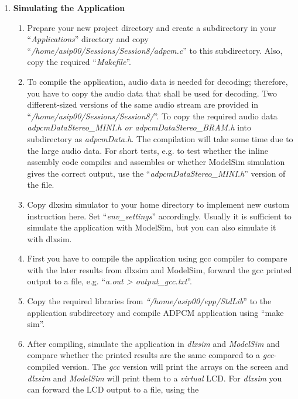 \documentclass[
]{article}
\begin{document}
\begin{enumerate}
\def\labelenumi{\arabic{enumi}.}
\setcounter{enumi}{2}
\item
  \textbf{Simulating the Application}

  \begin{enumerate}
  \def\labelenumii{\arabic{enumii}.}
  \item
    Prepare your new project directory and create a subdirectory in your
    ``\emph{Applications}'' directory and copy
    ``\emph{/home/asip00/Sessions/Session8/adpcm.c}'' to this
    subdirectory. Also, copy the required ``\emph{Makefile}''.
  \item
    To compile the application, audio data is needed for decoding;
    therefore, you have to copy the audio data that shall be used for
    decoding. Two different-sized versions of the same audio stream are
    provided in ``\emph{/home/asip00/Sessions/Session8/}''. To copy the
    required audio data \emph{adpcmDataStereo\_MINI.h or
    adpcmDataStereo\_BRAM.h} into subdirectory as \emph{adpcmData.h}.
    The compilation will take some time due to the large audio data. For
    short tests, e.g. to test whether the inline assembly code compiles
    and assembles or whether ModelSim simulation gives the correct
    output, use the ``\emph{adpcmDataStereo\_MINI.h}'' version of the
    file.
  \item
    Copy dlxsim simulator to your home directory to implement new custom
    instruction here. Set ``\emph{env\_settings}'' accordingly. Usually
    it is sufficient to simulate the application with ModelSim, but you
    can also simulate it with dlxsim.
  \item
    First you have to compile the application using gcc compiler to
    compare with the later results from dlxsim and ModelSim, forward the
    gcc printed output to a file, e.g. ``\emph{a.out \textgreater{}
    output\_gcc.txt}''.
  \item
    Copy the required libraries from \emph{``/home/asip00/epp/StdLib}''
    to the application subdirectory and compile ADPCM application using
    ``make sim''.
  \item
    After compiling, simulate the application in \emph{dlxsim} and
    \emph{ModelSim} and compare whether the printed results are the same
    compared to a \emph{gcc}-compiled version. The \emph{gcc} version
    will print the arrays on the screen and \emph{dlxsim} and
    \emph{ModelSim} will print them to a \emph{virtual} LCD. For
    \emph{dlxsim} you can forward the LCD output to a file, using the

\end{enumerate}
\end{enumerate}
\end{document}
